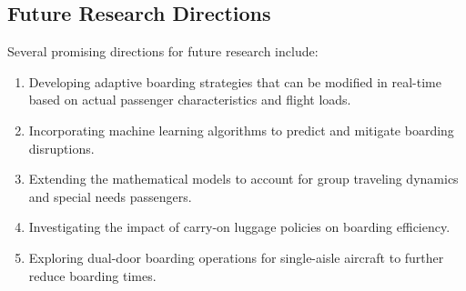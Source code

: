 \documentclass[12pt,a4paper]{article}
\begin{document}
\subsection{Future Research Directions}

Several promising directions for future research include:

\begin{enumerate}
    \item Developing adaptive boarding strategies that can be modified in real-time based on actual passenger characteristics and flight loads.
    
    \item Incorporating machine learning algorithms to predict and mitigate boarding disruptions.
    
    \item Extending the mathematical models to account for group traveling dynamics and special needs passengers.
    
    \item Investigating the impact of carry-on luggage policies on boarding efficiency.
    
    \item Exploring dual-door boarding operations for single-aisle aircraft to further reduce boarding times.
\end{enumerate}
\end{document}

